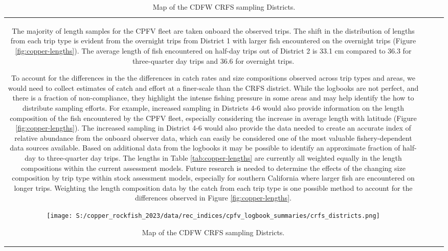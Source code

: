 \documentclass[11pt,
  letterpaper,
]{article}
\begin{document}
\begin{longtable}[t]{c>{\centering\arraybackslash}p{2cm}>{\centering\arraybackslash}p{2cm}>{\centering\arraybackslash}p{2cm}}
The majority of length samples for the CPFV fleet are taken onboard the observed trips. The shift in the distribution of lengths from each trip type is evident from the overnight trips from District 1 with larger fish encountered on the overnight trips (Figure \ref{fig:copper-lengths}). The average length of fish encountered on half-day trips out of District 2 is 33.1 cm compared to 36.3 for three-quarter day trips and 36.6 for overnight trips.

To account for the differences in the the differences in catch rates and size compositions observed across trip types and areas, we would need to collect estimates of catch and effort at a finer-scale than the CRFS district. While the logbooks are not perfect, and there is a fraction of non-compliance, they highlight the intense fishing pressure in some areas and may help identify the how to distribute sampling efforts. For example, increased sampling in Districts 4-6 would also provide information on the length composition of the fish encountered by the CPFV fleet, especially considering the increase in average length with latitude (Figure \ref{fig:copper-lengths}). The increased sampling in District 4-6 would also provide the data needed to create an accurate index of relative abundance from the onboard observer data, which can easily be considered one of the most valuable fishery-dependent data sources available. Based on additional data from the logbooks it may be possible to identify an approximate fraction of half-day to three-quarter day trips. The lengths in Table \ref{tab:copper-lengths} are currently all weighted equally in the length compositions within the current assessment models. Future research is needed to determine the effects of the changing size composition by trip type within stock assessment models, especially for southern California where larger fish are encountered on longer trips. Weighting the length composition data by the catch from each trip type is one possible method to account for the differences observed in Figure \ref{fig:copper-lengths}.

\newpage

\begin{figure}
{\centering
\texttt{[image: S:/copper\_rockfish\_2023/data/rec\_indices/cpfv\_logbook\_summaries/crfs\_districts.png]}
}
\caption{Map of the CDFW CRFS sampling Districts.\label{fig:crfs-districts}}
\end{figure}


\end{longtable}
\end{document}
